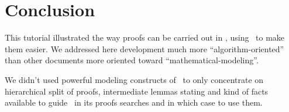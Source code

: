 \section{Conclusion}
This tutorial illustrated the way proofs can be carried out in \focal,
using \zenon\ to make them easier. We addressed here development much
more ``algorithm-oriented'' than other documents more oriented toward
``mathematical-modeling''.

We didn't used powerful modeling constructs of \focal\ to only
concentrate on hierarchical split of proofs, intermediate lemmas
stating and kind of facts available to guide \zenon\ in its proofs
searches and in which case to use them.

